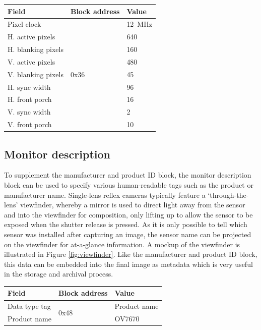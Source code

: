 \begin{table}[h]
    \begin{tabular}{lll}
        Field               & Block address             & Value                 \\
        \hline
        Pixel clock         & \multirow{9}{*}{0x36}     & \SI{12}{\mega\hertz}  \\
        H. active pixels    &                           & 640                   \\
        H. blanking pixels  &                           & 160                   \\
        V. active pixels    &                           & 480                   \\ 
        V. blanking pixels  &                           & 45                    \\
        H. sync width       &                           & 96                    \\
        H. front porch      &                           & 16                    \\
        V. sync width       &                           & 2                     \\
        V. front porch      &                           & 10                    \\
    \end{tabular}
\end{table}

\subsection{Monitor description}
To supplement the manufacturer and product ID block, the monitor description block can be used to specify various human-readable tags such as the product or manufacturer name. Single-lens reflex cameras typically feature a `through-the-lens' viewfinder, whereby a mirror is used to direct light away from the sensor and into the viewfinder for composition, only lifting up to allow the sensor to be exposed when the shutter release is pressed. As it is only possible to tell which sensor was installed after capturing an image, the sensor name can be projected on the viewfinder for at-a-glance information. A mockup of the viewfinder is illustrated in Figure \ref{fig:viewfinder}. Like the manufacturer and product ID block, this data can be embedded into the final image as metadata which is very useful in the storage and archival process.

\begin{table}[h]
    \begin{tabular}{lll}
        Field               & Block address             & Value             \\
        \hline
        Data type tag       & \multirow{2}{*}{0x48}     & Product name      \\
        Product name        &                           & OV7670            \\
    \end{tabular}
\end{table}

